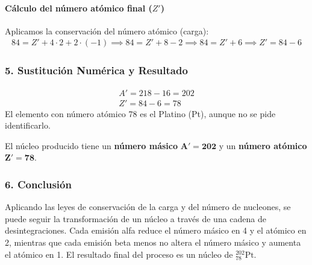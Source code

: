 \paragraph{Cálculo del número atómico final ($Z'$)}
Aplicamos la conservación del número atómico (carga):
\begin{gather}
    84 = Z' + 4 \cdot 2 + 2 \cdot (-1) \implies 84 = Z' + 8 - 2 \implies 84 = Z' + 6 \implies Z' = 84 - 6
\end{gather}

\subsubsection*{5. Sustitución Numérica y Resultado}
\begin{gather}
    A' = 218 - 16 = 202 \\
    Z' = 84 - 6 = 78
\end{gather}
El elemento con número atómico 78 es el Platino (Pt), aunque no se pide identificarlo.
\begin{cajaresultado}
El núcleo producido tiene un \textbf{número másico} $\boldsymbol{A'=202}$ y un \textbf{número atómico} $\boldsymbol{Z'=78}$.
\end{cajaresultado}

\subsubsection*{6. Conclusión}
\begin{cajaconclusion}
Aplicando las leyes de conservación de la carga y del número de nucleones, se puede seguir la transformación de un núcleo a través de una cadena de desintegraciones. Cada emisión alfa reduce el número másico en 4 y el atómico en 2, mientras que cada emisión beta menos no altera el número másico y aumenta el atómico en 1. El resultado final del proceso es un núcleo de ${}_{78}^{202}\text{Pt}$.
\end{cajaconclusion}

\newpage